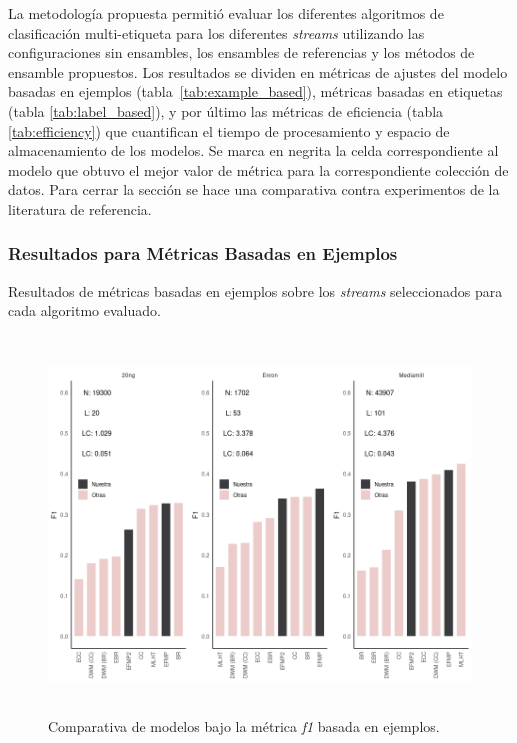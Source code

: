 La metodología propuesta permitió evaluar los diferentes algoritmos de
clasificación multi-etiqueta para los diferentes \textit{streams} utilizando las
configuraciones sin ensambles, los ensambles de referencias y los métodos de
ensamble propuestos. Los resultados se dividen en métricas de ajustes del modelo
basadas en ejemplos (tabla~\ref{tab:example_based}), métricas basadas en
etiquetas (tabla \ref{tab:label_based}), y por último las métricas de eficiencia
(tabla \ref{tab:efficiency}) que cuantifican el tiempo de procesamiento y
espacio de almacenamiento de los modelos. Se marca en negrita la celda
correspondiente al modelo que obtuvo el mejor valor de métrica para la
correspondiente colección de datos. Para cerrar la sección se hace una
comparativa contra experimentos de la literatura de referencia.

\subsubsection{Resultados para Métricas Basadas en Ejemplos}

\begin{table}[htbp]
	\centering
	\begin{adjustbox}{max width=\textwidth}
		
	\end{adjustbox}
	\begin{adjustbox}{max width=\textwidth}
		
	\end{adjustbox}
	\caption{Resultados de métricas basadas en ejemplos sobre los
		\textit{streams} seleccionados para cada algoritmo evaluado.}
	\label{tab:example_based}
\end{table}

\begin{figure}
	\includegraphics[width=\linewidth,height=10cm]{figures/experiments/classification/f1_ex.png}
	\caption{Comparativa de modelos bajo la métrica \textit{f1} basada en
		ejemplos.}
	\label{fig:comparativa_f1_ex}
\end{figure}

